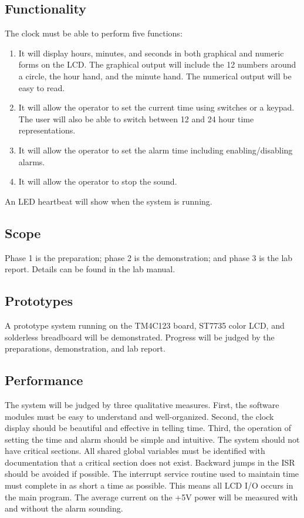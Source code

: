 \documentclass{article}
\begin{document}
	\subsection{Functionality}
		The clock must be able to perform five functions:
		\begin{enumerate}
			\item
				It will display hours, minutes, and seconds in both graphical and numeric forms on the LCD. The graphical output will include the 12 numbers around a circle, the hour hand, and the minute hand. The numerical output will be easy to read.
			
			\item
				It will allow the operator to set the current time using switches or a keypad. The user will also be able to switch between 12 and 24 hour time representations.
				
			\item
				It will allow the operator to set the alarm time including enabling/disabling alarms.
				
			\item
				It will allow the operator to stop the sound.				
		\end{enumerate}
		An LED heartbeat will show when the system is running.
	
	\subsection{Scope}
		Phase 1 is the preparation; phase 2 is the demonstration; and phase 3 is the lab report. Details can be found in the lab manual.
	
	\subsection{Prototypes}
		A prototype system running on the TM4C123 board, ST7735 color LCD, and solderless breadboard will be demonstrated. Progress will be judged by the preparations, demonstration, and lab report.
	
	\subsection{Performance}
		The system will be judged by three qualitative measures. First, the software modules must be easy to understand and well-organized. Second, the clock display should be beautiful and effective in telling time. Third, the operation of setting the time and alarm should be simple and intuitive. The system should not have critical sections. All shared global variables must be identified with documentation that a critical section does not exist. Backward jumps in the ISR should be avoided if possible. The interrupt service routine used to maintain time must complete in as short a time as possible. This means all LCD I/O occurs in the main program. The average current on the +5V power will be measured with and without the alarm sounding.
	
\end{document}
